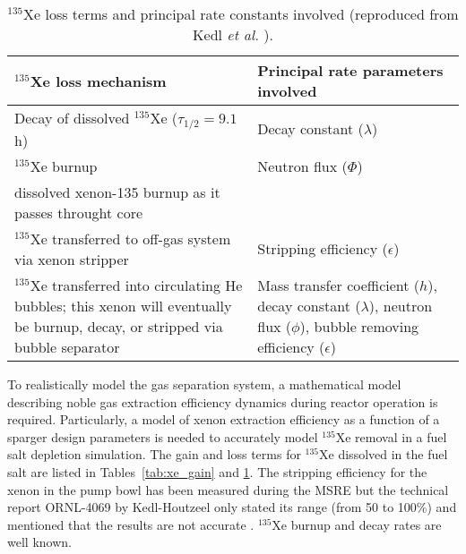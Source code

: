 \begin{table}[b]
	\caption{$^{135}$Xe loss terms and principal rate constants involved
		(reproduced from Kedl \emph{et al.} \cite{kedl_development_1967}).}
	\centering
	\begin{tabularx}{\textwidth}{b b}
		\hline \textbf{$^{135}$Xe loss mechanism}      & \textbf{Principal 
		rate 
			parameters involved}  	\\
		\hline Decay of dissolved $^{135}$Xe ($\tau_{1/2}=9.1$ h)  & Decay 
		constant	($\lambda$)		\\
		\hline $^{135}$Xe burnup              &  Neutron flux 
		($\Phi$)		 					\\
		dissolved xenon-135 burnup as it passes throught core  
		& 			            \\		\hline $^{135}$Xe transferred to 
		off-gas system via xenon stripper & Stripping efficiency 
		($\epsilon$)		\\
		\hline $^{135}$Xe transferred into circulating He bubbles; this xenon 
		will eventually be burnup, decay, or stripped via bubble separator & 
		Mass transfer coefficient ($h$), decay constant ($\lambda$), 
		neutron flux ($\phi$), bubble removing efficiency ($\epsilon$)		\\
		\hline 
	\end{tabularx}
	\label{tab:xe_loss}
\end{table}

To realistically model the gas separation system, a mathematical model 
describing noble gas extraction efficiency dynamics during reactor operation 
is required. Particularly, a model of xenon extraction efficiency as a 
function of a sparger design parameters is needed to accurately model 
$^{135}$Xe removal in a fuel salt depletion simulation. The gain and loss 
terms for $^{135}$Xe dissolved in the fuel salt are listed in 
Tables~\ref{tab:xe_gain} and \ref{tab:xe_loss}. The stripping efficiency for 
the xenon in the pump bowl has been measured during the \gls{MSRE} but the 
technical report ORNL-4069 by Kedl-Houtzeel only stated its range (from 50 to 
100\%) and mentioned that the results are not accurate 
\cite{kedl_development_1967}. $^{135}$Xe burnup and decay rates are well 
known. 

